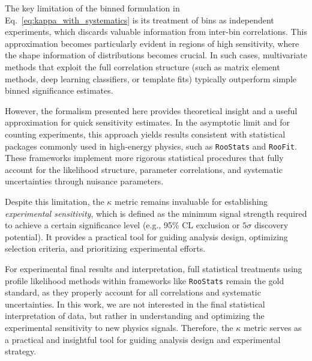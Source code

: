 The key limitation of the binned formulation in Eq.~\ref{eq:kappa_with_systematics} is its treatment of bins as independent experiments, which discards valuable information from inter-bin correlations. This approximation becomes particularly evident in regions of high sensitivity, where the shape information of distributions becomes crucial. In such cases, multivariate methods that exploit the full correlation structure (such as matrix element methods, deep learning classifiers, or template fits) typically outperform simple binned significance estimates.

However, the formalism presented here provides theoretical insight and a useful approximation for quick sensitivity estimates. In the asymptotic limit and for counting experiments, this approach yields results consistent with statistical packages commonly used in high-energy physics, such as \texttt{RooStats} and \texttt{RooFit}. These frameworks implement more rigorous statistical procedures that fully account for the likelihood structure, parameter correlations, and systematic uncertainties through nuisance parameters.


Despite this limitation, the $\kappa$ metric remains invaluable for establishing \textit{experimental sensitivity}, which is defined as the minimum signal strength required to achieve a certain significance level (e.g., 95\% CL exclusion or $5\sigma$ discovery potential). It provides a practical tool for guiding analysis design, optimizing selection criteria, and prioritizing experimental efforts. 

For experimental final results and interpretation, full statistical treatments using profile likelihood methods within frameworks like \texttt{RooStats} remain the gold standard, as they properly account for all correlations and systematic uncertainties. In this work, we are not interested in the final statistical interpretation of data, but rather in understanding and optimizing the experimental sensitivity to new physics signals. Therefore, the $\kappa$ metric serves as a practical and insightful tool for guiding analysis design and experimental strategy.

